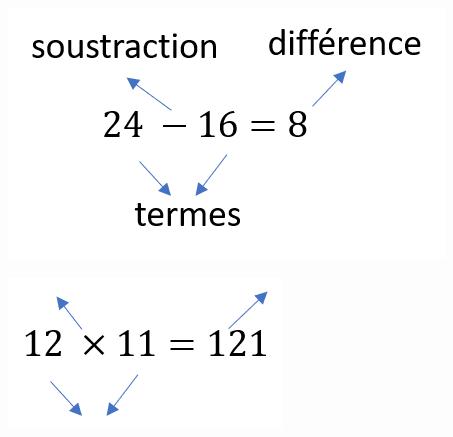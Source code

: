 \documentclass[xcolor={dvipsnames}]{beamer}
\begin{document}
\begin{frame}
	\begin{center}
		\includegraphics[scale=0.8]{difference}
	\end{center}
	
	\vspace*{1cm}
	\begin{center}
		\includegraphics[scale=0.8]{produit2}
	\end{center}
\end{frame}
\end{document}

